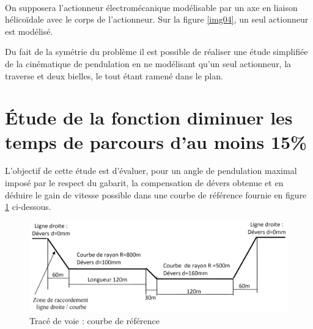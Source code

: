 
~\

On supposera l'actionneur électromécanique modélisable par un axe en liaison hélicoïdale avec le corps de l'actionneur. Sur la figure \ref{img04}, un seul actionneur est modélisé.

Du fait de la symétrie du problème il est possible de réaliser une étude simplifiée de la cinématique de pendulation en ne modélisant qu'un seul actionneur, la traverse et deux bielles, le tout étant ramené dans le plan.



\section{Étude de la fonction \og diminuer les temps de parcours d'au moins 15\% \fg}

L'objectif de cette étude est d'évaluer, pour un angle de pendulation maximal imposé par le respect du gabarit, la compensation de dévers obtenue et en déduire le gain de vitesse possible dans une courbe de référence fournie en figure \ref{img05} ci-dessous.

\begin{figure}[!h]
 \centering\includegraphics[width=0.7\linewidth]{img/fig5}
 \caption{Tracé de voie : courbe de référence}
 \label{img05}
\end{figure}


